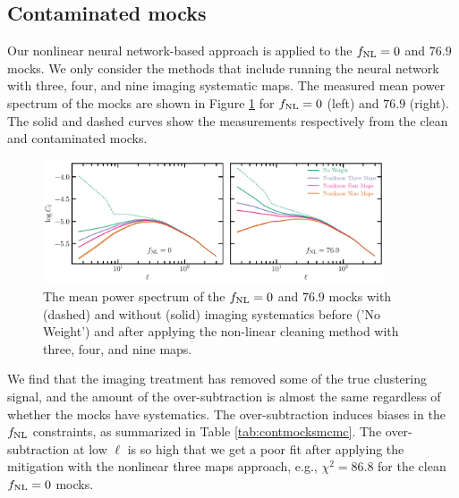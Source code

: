 \subsection{Contaminated mocks}
Our nonlinear neural network-based approach is applied to the $f_{\rm NL}=0$ and $76.9$ mocks. We only consider the methods that include running the neural network with three, four, and nine imaging systematic maps. The measured mean power spectrum of the mocks are shown in Figure \ref{fig:clmocks} for $f_{\rm NL}=0$ (left) and $76.9$ (right). The solid and dashed curves show the measurements respectively from the clean and contaminated mocks.

\begin{figure}
    \centering
    \includegraphics[width=0.9\textwidth]{figures/clmocks.pdf}
    \caption{The mean power spectrum of the $f_{\rm NL} =0$ and $76.9$ mocks with (dashed) and without (solid) imaging systematics before ('No Weight') and after applying the non-linear cleaning method with three, four, and nine maps.}\label{fig:clmocks}
\end{figure}


We find that the imaging treatment has removed some of the true clustering signal, and the amount of the over-subtraction is almost the same regardless of whether the mocks have systematics. The over-subtraction induces biases in the $f_{\rm NL}$ constraints, as summarized in Table \ref{tab:contmocksmcmc}. The over-subtraction at low $\ell$ is so high that we get a poor fit after applying the mitigation with the nonlinear three maps approach, e.g., $\chi^{2}=86.8$ for the clean $f_{\rm NL}=0$ mocks.


